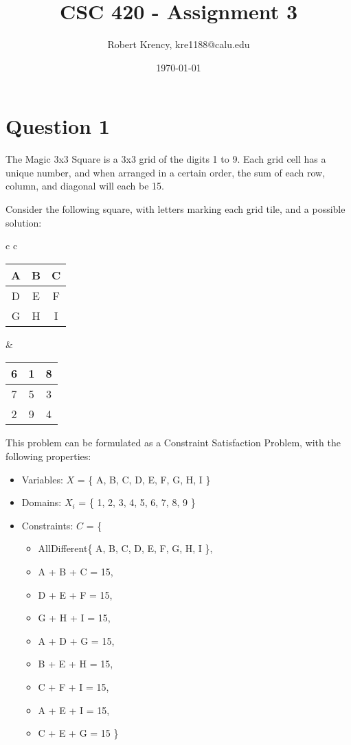 \documentclass[12pt]{article}
\title{CSC 420 - Assignment 3}
\author{Robert Krency, kre1188@calu.edu \\}
\date{\today}
\begin{document}
\maketitle

\section{Question 1}

The Magic 3x3 Square is a 3x3 grid of the digits 1 to 9. Each grid cell has a unique number, and when arranged in a certain order,
the sum of each row, column, and diagonal will each be 15. 

Consider the following square, with letters marking each grid tile, and a possible solution:

\begin{center}

\begin{tabular}{c c}

\begin{tabular}{| c | c | c |}
    \hline 
    A & B & C \\ \hline
    D & E & F \\ \hline
    G & H & I \\ \hline
\end{tabular}

&

\begin{tabular}{| c | c | c |}
    \hline 
    6 & 1 & 8 \\ \hline
    7 & 5 & 3 \\ \hline
    2 & 9 & 4 \\ \hline
\end{tabular}

\end{tabular}
\end{center}

This problem can be formulated as a Constraint Satisfaction Problem, with the following properties:

\begin{itemize}
    \item Variables: $X$ = \{ A, B, C, D, E, F, G, H, I \}
    \item Domains: $X_i$ = \{ 1, 2, 3, 4, 5, 6, 7, 8, 9 \}
    \item Constraints: $C$ = \{
    \begin{itemize}
        \item AllDifferent\{ A, B, C, D, E, F, G, H, I \},
        \item A + B + C = 15,
        \item D + E + F = 15,
        \item G + H + I = 15,
        \item A + D + G = 15,
        \item B + E + H = 15,
        \item C + F + I = 15,
        \item A + E + I = 15,
        \item C + E + G = 15 \}
    \end{itemize}
\end{itemize}
\end{document}
